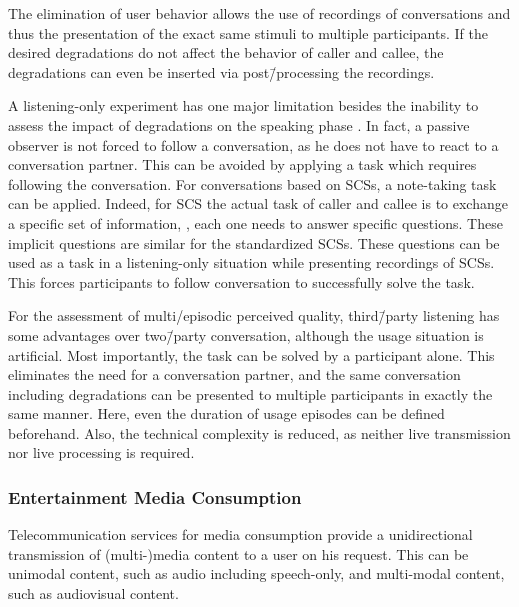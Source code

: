 The elimination of user behavior allows the use of recordings of conversations and thus the presentation of the exact same stimuli to multiple participants.
If the desired degradations do not affect the behavior of caller and callee, the degradations can even be inserted via post\=/processing the recordings.

A listening-only experiment has one major limitation besides the inability to assess the impact of degradations on the speaking phase \citep{gueguin_evaluation_2008}.
In fact, a passive observer is not forced to follow a conversation, as he does not have to react to a conversation partner.
This can be avoided by applying a task which requires following the conversation.
For conversations based on \acp{SCS}, a note-taking task can be applied.
Indeed, for \ac{SCS} the actual task of caller and callee is to exchange a specific set of information, \ie, each one needs to answer specific questions.
These implicit questions are similar for the standardized \acp{SCS}.
These questions can be used as a task in a listening-only situation while presenting recordings of \acp{SCS}.
This forces participants to follow conversation to successfully solve the task.

For the assessment of multi\-/episodic perceived quality, third\=/party listening has some advantages over two\=/party conversation, although the usage situation is artificial.
Most importantly, the task can be solved by a participant alone.
This eliminates the need for a conversation partner, and the same conversation including degradations can be presented to multiple participants in exactly the same manner.
Here, even the duration of usage episodes can be defined beforehand.
Also, the technical complexity is reduced, as neither live transmission nor live processing is required.

\subsubsection*{Entertainment Media Consumption}
Telecommunication services for media consumption provide a unidirectional transmission of (multi-)media content to a user on his request.
This can be unimodal content, such as audio including speech-only, and multi-modal content, such as audiovisual content.

